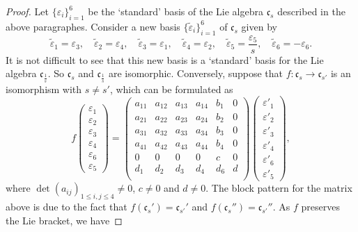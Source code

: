 \documentclass{amsart}
\numberwithin{equation}{section}
\theoremstyle{definition}
\renewcommand{\1}{\mathds{1}}
\renewcommand{\>}{\rightarrow}
\begin{document}
\begin{proof}
Let $\{\varepsilon_i\}_{i=1}^6$ be the `standard' basis of the Lie algebra $\mathfrak{c}_s$ described in the above paragraphes. Consider a new basis $\{\tilde{\varepsilon}_i\}_{i=1}^6$ of $\mathfrak{c}_s$ given by
\[\tilde{\varepsilon}_1=\varepsilon_3,\quad \tilde{\varepsilon}_2=\varepsilon_4,\quad \tilde{\varepsilon}_3=\varepsilon_1,\quad \tilde{\varepsilon}_4=\varepsilon_2,\quad
\tilde{\varepsilon}_5=\frac{\varepsilon_5}{s},\quad \tilde{\varepsilon}_6=-\varepsilon_6.\]
It is not difficult to see that this new basis is a `standard' basis for the Lie algebra $\mathfrak{c}_{\frac{1}{s}}$. So ${\mathfrak c}_s$ and $\mathfrak{c}_{\frac{1}{s}}$ are isomorphic.
Conversely, suppose that $f:{\mathfrak c}_s \rightarrow {\mathfrak c}_{s'}$ is an isomorphism with $s \neq s'$, which can be formulated as
\[f\begin{pmatrix} \varepsilon_1 \\ \varepsilon_2 \\ \varepsilon_3 \\ \varepsilon_4 \\ \varepsilon_6 \\ \varepsilon_5 \end{pmatrix}
=\begin{pmatrix} a_{11} & a_{12} & a_{13} & a_{14} & b_1 & 0\\
                 a_{21} & a_{22} & a_{23} & a_{24} & b_2 & 0\\
                 a_{31} & a_{32} & a_{33} & a_{34} & b_3 & 0\\
                 a_{41} & a_{42} & a_{43} & a_{44} & b_4 & 0\\
                    0    &     0   &     0   &     0   &  c  & 0 \\
                 d_{1}  & d_{2}  & d_{3}  & d_{4}  & d_6 & d\\
                 \end{pmatrix}
\begin{pmatrix} \varepsilon'_1 \\ \varepsilon'_2 \\ \varepsilon'_3 \\ \varepsilon'_4 \\ \varepsilon'_6 \\ \varepsilon'_5 \end{pmatrix},\]
where $\det(a_{ij})_{1\leq i,j \leq 4} \neq 0$, $c \neq 0$ and $d \neq 0$. The block pattern for the matrix above is due to the fact that  $f({\mathfrak c}_s') = {\mathfrak c}_{s'}'$ and $f({\mathfrak c}_s'') = {\mathfrak c}_{s'}''$. As $f$ preserves the Lie bracket, we have

\end{proof}
\end{document}
